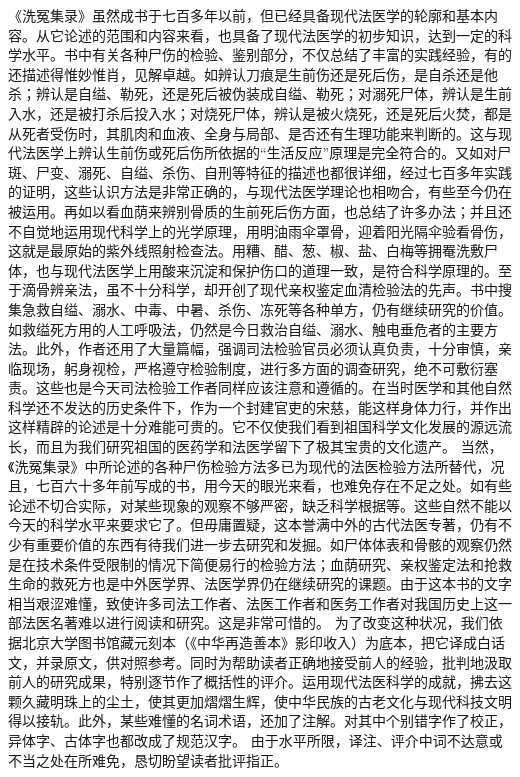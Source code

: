 \documentclass[12pt,UTF8]{ctexbook}
\begin{document}
《洗冤集录》虽然成书于七百多年以前，但已经具备现代法医学的轮廓和基本内容。从它论述的范围和内容来看，也具备了现代法医学的初步知识，达到一定的科学水平。书中有关各种尸伤的检验、鉴别部分，不仅总结了丰富的实践经验，有的还描述得惟妙惟肖，见解卓越。如辨认刀痕是生前伤还是死后伤，是自杀还是他杀；辨认是自缢、勒死，还是死后被伪装成自缢、勒死；对溺死尸体，辨认是生前入水，还是被打杀后投入水；对烧死尸体，辨认是被火烧死，还是死后火焚，都是从死者受伤时，其肌肉和血液、全身与局部、是否还有生理功能来判断的。这与现代法医学上辨认生前伤或死后伤所依据的“生活反应”原理是完全符合的。又如对尸斑、尸变、溺死、自缢、杀伤、自刑等特征的描述也都很详细，经过七百多年实践的证明，这些认识方法是非常正确的，与现代法医学理论也相吻合，有些至今仍在被运用。再如以看血荫来辨别骨质的生前死后伤方面，也总结了许多办法；并且还不自觉地运用现代科学上的光学原理，用明油雨伞罩骨，迎着阳光隔伞验看骨伤，这就是最原始的紫外线照射检查法。用糟、醋、葱、椒、盐、白梅等拥罨洗敷尸体，也与现代法医学上用酸来沉淀和保护伤口的道理一致，是符合科学原理的。至于滴骨辨亲法，虽不十分科学，却开创了现代亲权鉴定血清检验法的先声。书中搜集急救自缢、溺水、中毒、中暑、杀伤、冻死等各种单方，仍有继续研究的价值。如救缢死方用的人工呼吸法，仍然是今日救治自缢、溺水、触电垂危者的主要方法。此外，作者还用了大量篇幅，强调司法检验官员必须认真负责，十分审慎，亲临现场，躬身视检，严格遵守检验制度，进行多方面的调查研究，绝不可敷衍塞责。这些也是今天司法检验工作者同样应该注意和遵循的。在当时医学和其他自然科学还不发达的历史条件下，作为一个封建官吏的宋慈，能这样身体力行，并作出这样精辟的论述是十分难能可贵的。它不仅使我们看到祖国科学文化发展的源远流长，而且为我们研究祖国的医药学和法医学留下了极其宝贵的文化遗产。
当然，《洗冤集录》中所论述的各种尸伤检验方法多已为现代的法医检验方法所替代，况且，七百六十多年前写成的书，用今天的眼光来看，也难免存在不足之处。如有些论述不切合实际，对某些现象的观察不够严密，缺乏科学根据等。这些自然不能以今天的科学水平来要求它了。但毋庸置疑，这本誉满中外的古代法医专著，仍有不少有重要价值的东西有待我们进一步去研究和发掘。如尸体体表和骨骸的观察仍然是在技术条件受限制的情况下简便易行的检验方法；血荫研究、亲权鉴定法和抢救生命的救死方也是中外医学界、法医学界仍在继续研究的课题。由于这本书的文字相当艰涩难懂，致使许多司法工作者、法医工作者和医务工作者对我国历史上这一部法医名著难以进行阅读和研究。这是非常可惜的。
为了改变这种状况，我们依据北京大学图书馆藏元刻本（《中华再造善本》影印收入）为底本，把它译成白话文，并录原文，供对照参考。同时为帮助读者正确地接受前人的经验，批判地汲取前人的研究成果，特别逐节作了概括性的评介。运用现代法医科学的成就，拂去这颗久藏明珠上的尘土，使其更加熠熠生辉，使中华民族的古老文化与现代科技文明得以接轨。此外，某些难懂的名词术语，还加了注解。对其中个别错字作了校正，异体字、古体字也都改成了规范汉字。
由于水平所限，译注、评介中词不达意或不当之处在所难免，恳切盼望读者批评指正。
\end{document}
